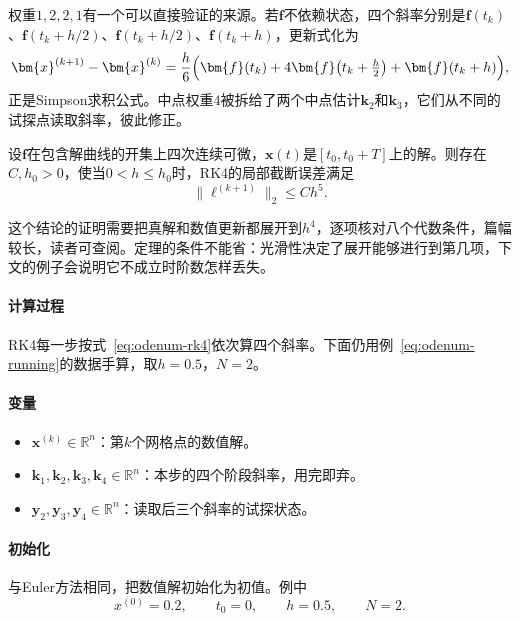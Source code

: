 权重$1,2,2,1$有一个可以直接验证的来源。若$\bm{f}$不依赖状态，四个斜率分别是$\bm{f}(t_k)$、$\bm{f}(t_k+h/2)$、$\bm{f}(t_k+h/2)$、$\bm{f}(t_k+h)$，更新式化为
\[
 \bm{x}^{(k+1)}-\bm{x}^{(k)}=\frac{h}{6}\Bigl(\bm{f}(t_k)+4\bm{f}\bigl(t_k+\tfrac{h}{2}\bigr)+\bm{f}(t_k+h)\Bigr),
\]
正是Simpson求积公式。中点权重$4$被拆给了两个中点估计$\bm{k}_2$和$\bm{k}_3$，它们从不同的试探点读取斜率，彼此修正。

\begin{theorem}[RK4的阶]
 \label{thm:odenum-rk4-order}
 设$\bm{f}$在包含解曲线的开集上四次连续可微，$\bm{x}(t)$是$[t_0,t_0+T]$上的解。则存在$C,h_0>0$，使当$0<h\leq h_0$时，RK4的局部截断误差满足
 \begin{equation}
  \bigl\lVert\bm{\ell}^{(k+1)}\bigr\rVert_2\leq Ch^{5}.
  \label{eq:odenum-rk4-local}
 \end{equation}
\end{theorem}

这个结论的证明需要把真解和数值更新都展开到$h^4$，逐项核对八个代数条件，篇幅较长，读者可查阅。定理的条件不能省：光滑性决定了展开能够进行到第几项，下文的例子会说明它不成立时阶数怎样丢失。

\paragraph{计算过程}
RK4每一步按式~\eqref{eq:odenum-rk4}依次算四个斜率。下面仍用例~\eqref{eq:odenum-running}的数据手算，取$h=0.5$，$N=2$。

\paragraph{变量}
\begin{itemize}
 \item $\bm{x}^{(k)}\in\mathbb{R}^{n}$：第$k$个网格点的数值解。
 \item $\bm{k}_1,\bm{k}_2,\bm{k}_3,\bm{k}_4\in\mathbb{R}^{n}$：本步的四个阶段斜率，用完即弃。
 \item $\bm{y}_2,\bm{y}_3,\bm{y}_4\in\mathbb{R}^{n}$：读取后三个斜率的试探状态。
\end{itemize}

\paragraph{初始化}
与Euler方法相同，把数值解初始化为初值。例中
\[
 x^{(0)}=0.2,\qquad t_0=0,\qquad h=0.5,\qquad N=2.
\]

